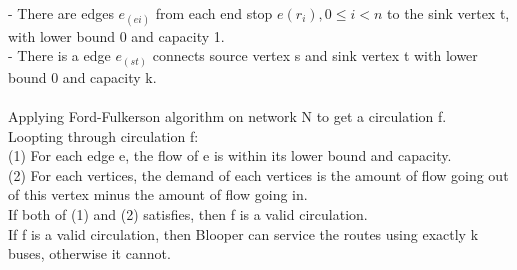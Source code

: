 \documentclass[10pt]{article}
\begin{document}
\begin{enumerate}
\begin{mdframed}
        \\- There are edges $e_(ei)$ from each end stop $e(r_i), 0\leq i <n$ to the sink vertex t, with lower bound 0 and capacity 1.
        \\- There is a edge $e_(st)$ connects source vertex s and sink vertex t with lower bound 0 and capacity k.
        \\
        \\Applying Ford-Fulkerson algorithm on network N to get a circulation f.
        \\Loopting through circulation f:
        \\(1) For each edge e, the flow of e is within its lower bound and capacity.
        \\(2) For each vertices, the demand of each vertices is the amount of flow going out of this vertex minus the amount of flow going in.
        \\If both of (1) and (2) satisfies, then f is a valid circulation.
        \\If f is a valid circulation, then Blooper can service the routes using exactly k buses, otherwise it cannot.
        

\end{mdframed}
\end{enumerate}
\end{document}
